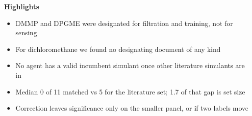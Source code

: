 \documentclass[11pt,a4paper]{article}
\begin{document}
\noindent\textbf{Highlights}\\[6pt]
\begin{itemize}\itemsep4pt
  \item DMMP and DPGME were designated for filtration and training, not for sensing
  \item For dichloromethane we found no designating document of any kind
  \item No agent has a valid incumbent simulant once other literature simulants are in
  \item Median 0 of 11 matched vs 5 for the literature set; 1.7 of that gap is set size
  \item Correction leaves significance only on the smaller panel, or if two labels move
\end{itemize}
\end{document}
